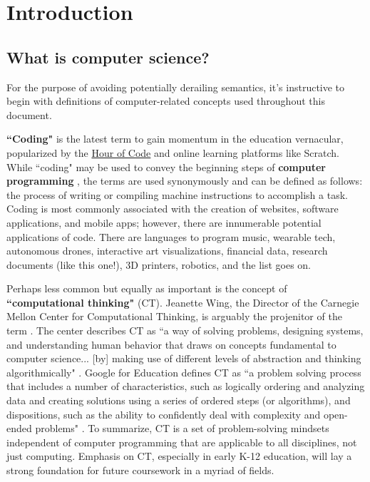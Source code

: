 
\chapter{Introduction} %

\label{Introduction} %



\section{What is computer science?}
For the purpose of avoiding potentially derailing semantics, it's instructive to begin with definitions of computer-related concepts used throughout this document. \par
\textbf{``Coding"} is the latest term to gain momentum in the education vernacular, popularized by the \href{https://hourofcode.com/us}{Hour of Code} and online learning platforms like Scratch. While ``coding" may be used to convey the beginning steps of \textbf{computer programming} \cite{huffpo}, the terms are used synonymously and can be defined as follows: the process of writing or compiling machine instructions to accomplish a task. Coding is most commonly associated with the creation of websites, software applications, and mobile apps; however, there are innumerable potential applications of code. There are languages to program music, wearable tech, autonomous drones, interactive art visualizations, financial data, research documents (like this one!), 3D printers, robotics, and the list goes on. \par
Perhaps less common but equally as important is the concept of \textbf{``computational thinking"} (CT). Jeanette Wing, the Director of the Carnegie Mellon Center for Computational Thinking, is arguably the projenitor of the term \cite{backtoschool}. The center describes CT as ``a way of solving problems, designing systems, and understanding human behavior that draws on concepts fundamental to computer science... [by] making use of different levels of abstraction and thinking algorithmically" \cite{cmct}. Google for Education defines CT as ``a problem solving process that includes a number of characteristics, such as logically ordering and analyzing data and creating solutions using a series of ordered steps (or algorithms), and dispositions, such as the ability to confidently deal with complexity and open-ended problems" \cite{googed}. To summarize, CT is a set of problem-solving mindsets independent of computer programming that are applicable to all disciplines, not just computing. Emphasis on CT, especially in early K-12 education, will lay a strong foundation for future coursework in a myriad of fields.\par

